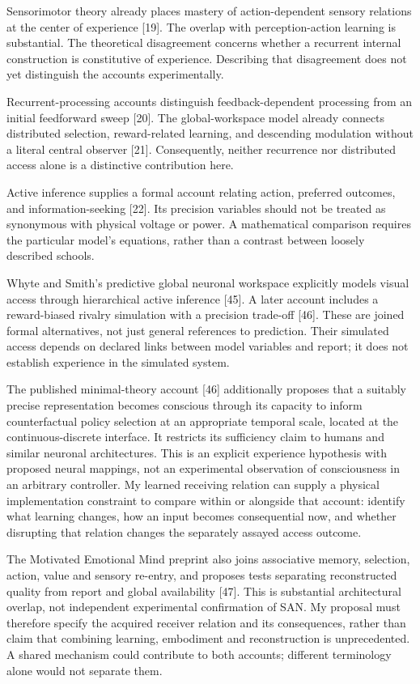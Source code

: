 \documentclass[
  american,
  11pt,
  letterpaper,
]{article}
\begin{document}
Sensorimotor theory already places mastery of action-dependent sensory relations at the center of experience {[}19{]}. The overlap with perception-action learning is substantial. The theoretical disagreement concerns whether a recurrent internal construction is constitutive of experience. Describing that disagreement does not yet distinguish the accounts experimentally.

Recurrent-processing accounts distinguish feedback-dependent processing from an initial feedforward sweep {[}20{]}. The global-workspace model already connects distributed selection, reward-related learning, and descending modulation without a literal central observer {[}21{]}. Consequently, neither recurrence nor distributed access alone is a distinctive contribution here.

Active inference supplies a formal account relating action, preferred outcomes, and information-seeking {[}22{]}. Its precision variables should not be treated as synonymous with physical voltage or power. A mathematical comparison requires the particular model's equations, rather than a contrast between loosely described schools.

Whyte and Smith's predictive global neuronal workspace explicitly models visual access through hierarchical active inference {[}45{]}. A later account includes a reward-biased rivalry simulation with a precision trade-off {[}46{]}. These are joined formal alternatives, not just general references to prediction. Their simulated access depends on declared links between model variables and report; it does not establish experience in the simulated system.

The published minimal-theory account {[}46{]} additionally proposes that a suitably precise representation becomes conscious through its capacity to inform counterfactual policy selection at an appropriate temporal scale, located at the continuous-discrete interface. It restricts its sufficiency claim to humans and similar neuronal architectures. This is an explicit experience hypothesis with proposed neural mappings, not an experimental observation of consciousness in an arbitrary controller. My learned receiving relation can supply a physical implementation constraint to compare within or alongside that account: identify what learning changes, how an input becomes consequential now, and whether disrupting that relation changes the separately assayed access outcome.

The Motivated Emotional Mind preprint also joins associative memory, selection, action, value and sensory re-entry, and proposes tests separating reconstructed quality from report and global availability {[}47{]}. This is substantial architectural overlap, not independent experimental confirmation of SAN. My proposal must therefore specify the acquired receiver relation and its consequences, rather than claim that combining learning, embodiment and reconstruction is unprecedented. A shared mechanism could contribute to both accounts; different terminology alone would not separate them.
\end{document}
